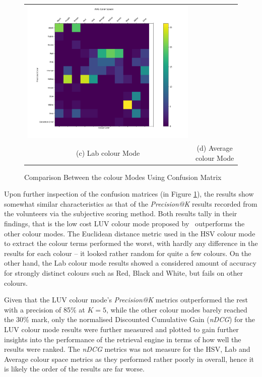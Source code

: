 \begin{figure}[tb!]
\begin{tabular}{cc}
    \includegraphics[width=0.4\linewidth]{image/retrievalTwo/avgCM.png} \\
    (c) Lab colour Mode & (d) Average colour Mode \\
  \end{tabular}
  \caption{Comparison Between the colour Modes Using Confusion Matrix}
  \label{fig:colorspace_Confuscore}
\end{figure}

Upon further inspection of the confusion matrices (in Figure \ref{fig:colorspace_Confuscore}), the results show somewhat similar characteristics as that of the \textit{Precision@K} results recorded from the volunteers via the subjective scoring method. Both results tally in their findings, that is the low cost LUV colour mode proposed by~ outperforms the other colour modes. The Euclidean distance metric used in the HSV colour mode to extract the colour terms performed the worst, with hardly any difference in the results for each colour -- it looked rather random for quite a few colours. On the other hand, the Lab colour mode results showed a considered amount of accuracy for strongly distinct colours such as Red, Black and White, but fails on other colours.

Given that the LUV colour mode's \textit{Precision@K} metrics outperformed the rest with a precision of 85\% at $K=5$, while the other colour modes barely reached the 30\% mark, only the normalised Discounted Cumulative Gain (\textit{nDCG}) for the LUV colour mode results were further measured and plotted to gain further insights into the performance of the retrieval engine in terms of how well the results were ranked. The \textit{nDCG} metrics was not measure for the HSV, Lab and Average colour space metrics as they performed rather poorly in overall, hence it is likely the order of the results are far worse. 


